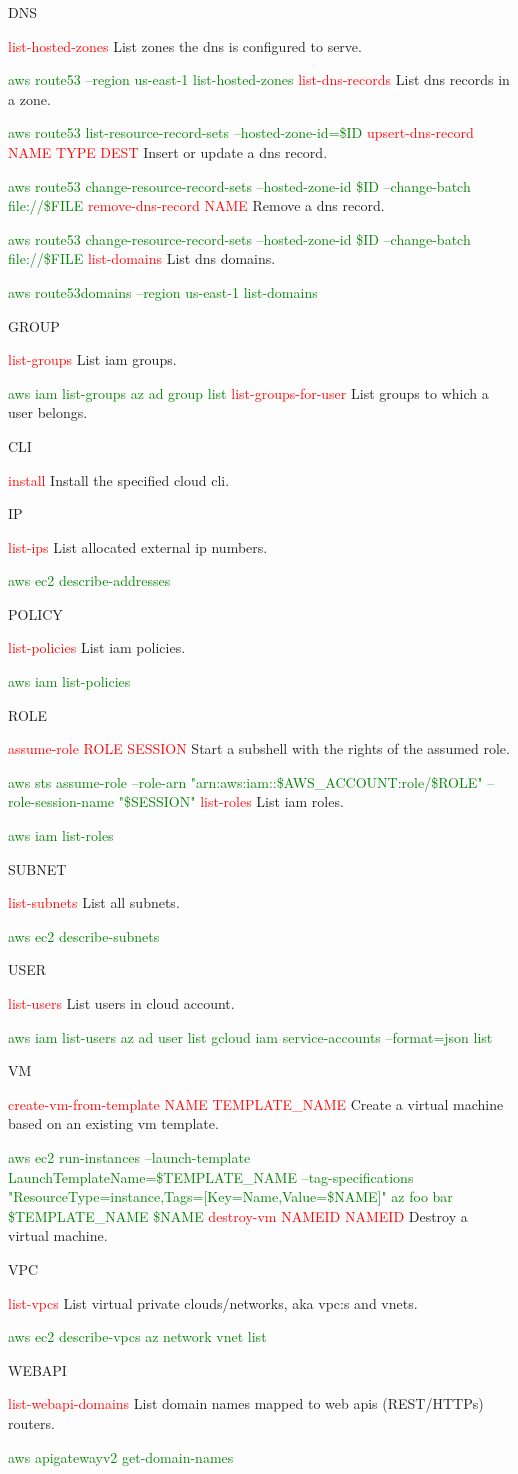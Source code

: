 \documentclass{article}
\newcommand{\cmd}[1]{\textcolor{Red}{#1}}
\newcommand{\help}[1]{#1\par}
\newcommand{\cloud}[1]{\textcolor{Green}{#1}}
\begin{document}
{\large DNS}\par
\cmd{list-hosted-zones} \help{List zones the dns is configured to serve.}
\cloud{aws route53 --region us-east-1 list-hosted-zones}
\cmd{list-dns-records} \help{List dns records in a zone.}
\cloud{aws route53 list-resource-record-sets --hosted-zone-id=\${ID}}
\cmd{upsert-dns-record NAME TYPE DEST} \help{Insert or update a dns record.}
\cloud{aws route53 change-resource-record-sets --hosted-zone-id \${ID} --change-batch file://\${FILE}}
\cmd{remove-dns-record NAME} \help{Remove a dns record.}
\cloud{aws route53 change-resource-record-sets --hosted-zone-id \${ID} --change-batch file://\${FILE}}
\cmd{list-domains} \help{List dns domains.}
\cloud{aws route53domains --region us-east-1 list-domains}

{\large GROUP}\par
\cmd{list-groups} \help{List iam groups.}
\cloud{aws iam list-groups}
\cloud{az ad group list}
\cmd{list-groups-for-user} \help{List groups to which a user belongs.}

{\large CLI}\par
\cmd{install} \help{Install the specified cloud cli.}

{\large IP}\par
\cmd{list-ips} \help{List allocated external ip numbers.}
\cloud{aws ec2 describe-addresses}

{\large POLICY}\par
\cmd{list-policies} \help{List iam policies.}
\cloud{aws iam list-policies}

{\large ROLE}\par
\cmd{assume-role ROLE SESSION} \help{Start a subshell with the rights of the assumed role.}
\cloud{aws sts assume-role --role-arn "arn:aws:iam::\${AWS\_ACCOUNT}:role/\$ROLE" --role-session-name "\$SESSION"}
\cmd{list-roles} \help{List iam roles.}
\cloud{aws iam list-roles}

{\large SUBNET}\par
\cmd{list-subnets} \help{List all subnets.}
\cloud{aws ec2 describe-subnets}

{\large USER}\par
\cmd{list-users} \help{List users in cloud account.}
\cloud{aws iam list-users}
\cloud{az ad user list}
\cloud{gcloud iam service-accounts --format=json list}

{\large VM}\par
\cmd{create-vm-from-template NAME TEMPLATE\_NAME} \help{Create a virtual machine based on an existing vm template.}
\cloud{aws ec2 run-instances --launch-template LaunchTemplateName=\${TEMPLATE\_NAME} --tag-specifications "ResourceType=instance,Tags=[{Key=Name,Value=\${NAME}}]"}
\cloud{az foo bar \${TEMPLATE\_NAME} \${NAME}}
\cmd{destroy-vm NAMEID NAMEID} \help{Destroy a virtual machine.}

{\large VPC}\par
\cmd{list-vpcs} \help{List virtual private clouds/networks, aka vpc:s and vnets.}
\cloud{aws ec2 describe-vpcs}
\cloud{az network vnet list}

{\large WEBAPI}\par
\cmd{list-webapi-domains} \help{List domain names mapped to web apis (REST/HTTPs) routers.}
\cloud{aws apigatewayv2 get-domain-names}
\end{document}

